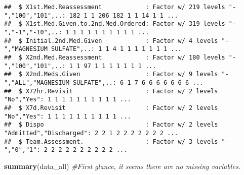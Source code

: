 \documentclass[]{article}
\newenvironment{Shaded}{\begin{snugshade}}{\end{snugshade}}
\newcommand{\KeywordTok}[1]{\textcolor[rgb]{0.13,0.29,0.53}{\textbf{#1}}}
\newcommand{\CommentTok}[1]{\textcolor[rgb]{0.56,0.35,0.01}{\textit{#1}}}
\newcommand{\NormalTok}[1]{#1}
\begin{document}
\begin{verbatim}
##  $ X1st.Med.Reassessment            : Factor w/ 219 levels "-","100","101",..: 182 1 1 206 182 1 1 14 1 1 ...
##  $ X1st.Med.Given.to.2nd.Med.Ordered: Factor w/ 319 levels "-","-1","-10",..: 1 1 1 1 1 1 1 1 1 1 ...
##  $ Initial.2nd.Med.Given            : Factor w/ 4 levels "-","MAGNESIUM SULFATE",..: 1 1 4 1 1 1 1 1 1 1 ...
##  $ X2nd.Med.Reassessment            : Factor w/ 180 levels "-","100","101",..: 1 1 97 1 1 1 1 1 1 1 ...
##  $ X2nd.Meds.Given                  : Factor w/ 9 levels "-","ALL","MAGNESIUM SULFATE",..: 6 1 7 6 6 6 6 6 6 6 ...
##  $ X72hr.Revisit                    : Factor w/ 2 levels "No","Yes": 1 1 1 1 1 1 1 1 1 1 ...
##  $ X7d.Revisit                      : Factor w/ 2 levels "No","Yes": 1 1 1 1 1 1 1 1 1 1 ...
##  $ Dispo                            : Factor w/ 2 levels "Admitted","Discharged": 2 2 1 2 2 2 2 2 2 2 ...
##  $ Team.Assessment.                 : Factor w/ 3 levels "-","0","1": 2 2 2 2 2 2 2 2 2 2 ...
\end{verbatim}

\begin{Shaded}
\begin{Highlighting}[]
\KeywordTok{summary}\NormalTok{(data_all) }\CommentTok{#First glance, it seems there are no missing variables. }
\end{Highlighting}
\end{Shaded}
\end{document}
